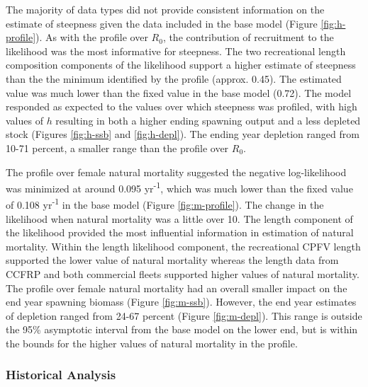 \documentclass[11pt,
  english,
  letterpaper,
]{article}
\begin{document}
The majority of data types did not provide consistent information on the estimate of steepness given the data included in the base model (Figure \ref{fig:h-profile}). As with the profile over \(R_0\), the contribution of recruitment to the likelihood was the most informative for steepness. The two recreational length composition components of the likelihood support a higher estimate of steepness than the the minimum identified by the profile (approx. 0.45). The estimated value was much lower than the fixed value in the base model (0.72). The model responded as expected to the values over which steepness was profiled, with high values of \(h\) resulting in both a higher ending spawning output and a less depleted stock (Figures \ref{fig:h-ssb} and \ref{fig:h-depl}). The ending year depletion ranged from 10-71 percent, a smaller range than the profile over \(R_0\).

The profile over female natural mortality suggested the negative log-likelihood was minimized at around 0.095 yr\textsuperscript{-1}, which was much lower than the fixed value of 0.108 yr\textsuperscript{-1} in the base model (Figure \ref{fig:m-profile}). The change in the likelihood when natural mortality was a little over 10. The length component of the likelihood provided the most influential information in estimation of natural mortality. Within the length likelihood component, the recreational CPFV length supported the lower value of natural mortality whereas the length data from CCFRP and both commercial fleets supported higher values of natural mortality. The profile over female natural mortality had an overall smaller impact on the end year spawning biomass (Figure \ref{fig:m-ssb}). However, the end year estimates of depletion ranged from 24-67 percent (Figure \ref{fig:m-depl}). This range is outside the 95\% asymptotic interval from the base model on the lower end, but is within the bounds for the higher values of natural mortality in the profile.

\hypertarget{historical-analysis}{%
\subsubsection{Historical Analysis}\label{historical-analysis}}
\end{document}
